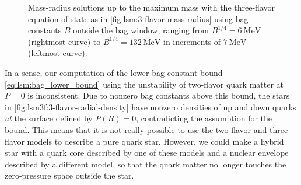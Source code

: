 \begin{figure}[b]
\centering
{}
\caption{\label{fig:lsm:3-flavor-mass-radius-outside}Mass-radius solutions up to the maximum mass with the three-flavor equation of state as in \cref{fig:lsm:3-flavor-mass-radius} using bag constants $B$ outside the bag window, ranging from $B^{1/4}=\SI{6}{\mega\electronvolt}$ (rightmost curve) to $B^{1/4}=\SI{132}{\mega\electronvolt}$ in increments of $\SI{7}{\mega\electronvolt}$ (leftmost curve).}
\end{figure}

In a sense, our computation of the lower bag constant bound \eqref{eq:lsm:bag_lower_bound} using the unstability of two-flavor quark matter at $P=0$ is inconsistent.
Due to nonzero bag constants above this bound, the stars in \cref{fig:lsm3f:3-flavor-radial-density} have nonzero densities of up and down quarks \emph{at} the surface defined by $P(R)=0$, contradicting the assumption for the bound.
This means that it is not really possible to use the two-flavor and three-flavor models to describe a pure quark star.
However, we could make a hybrid star with a quark core described by one of these models and a nuclear envelope described by a different model, so that the quark matter no longer touches the zero-pressure space outside the star.

